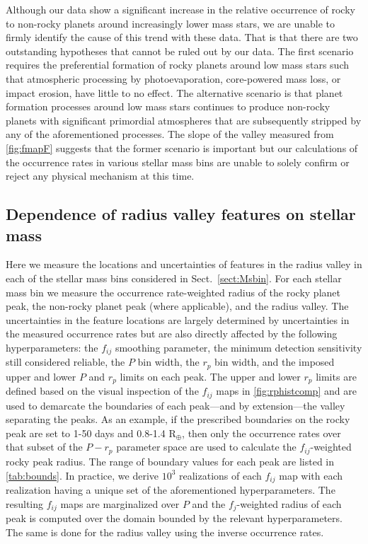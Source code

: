 \documentclass[twocolumn]{emulateapj}
\begin{document}
Although our data show a significant increase in the relative occurrence of rocky to non-rocky planets
around increasingly lower mass stars, we are unable to firmly identify the cause of this trend with these data.
That is that there are two outstanding hypotheses that cannot be ruled out by our data. The first scenario
requires the preferential formation of rocky planets around low mass stars such that atmospheric processing
by photoevaporation, core-powered mass loss, or impact erosion, have little to no effect. The alternative scenario
is that planet formation processes around low mass stars continues to produce non-rocky planets with significant
primordial atmospheres that are subsequently stripped by any of the aforementioned processes. The slope of the
valley measured from \autoref{fig:fmapF} suggests that the former scenario is important but our calculations of
the occurrence rates in various stellar mass bins are unable to solely confirm or reject any physical mechanism
at this time. 


\subsection{Dependence of radius valley features on stellar mass}
Here we measure the locations and uncertainties of features in the radius valley in each of the stellar
mass bins considered in Sect.~\ref{sect:Msbin}. For each stellar mass bin
we measure the occurrence rate-weighted radius of the rocky planet peak,
the non-rocky planet peak (where applicable), and the radius valley. The uncertainties in the feature locations
are largely determined by uncertainties in the measured occurrence rates but are also directly affected by
the following hyperparameters: the $f_{ij}$ smoothing parameter, the minimum detection sensitivity still
considered reliable,
the $P$ bin width, the $r_p$ bin width, and the imposed upper and
lower $P$ and $r_p$ limits on each peak. The upper and lower $r_p$ limits are defined based on the visual
inspection of the $f_{ij}$ maps in \autoref{fig:rphistcomp} and are used to demarcate the
boundaries of each peak---and by extension---the valley separating the peaks.
As an example, if the prescribed boundaries on the rocky peak are set to 1-50 days and 0.8-1.4 R$_{\oplus}$,
then only the occurrence rates over that subset of the $P-r_p$ parameter space are used to calculate the
$f_{ij}$-weighted rocky peak radius. The range of boundary values for each peak are listed in
\autoref{tab:bounds}. In practice, we derive $10^3$ realizations of each $f_{ij}$ map with each realization
having a unique set of the aforementioned hyperparameters.
The resulting $f_{ij}$ maps are marginalized over $P$ and the $f_j$-weighted radius of
each peak is computed over the domain bounded by the relevant hyperparameters.
The same is done for the radius valley using the inverse occurrence rates.
\end{document}
